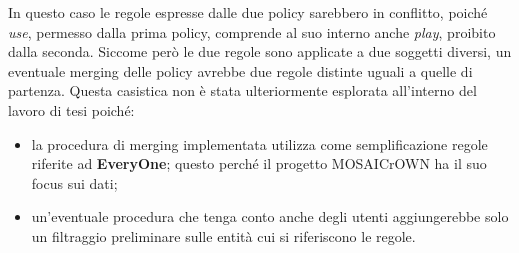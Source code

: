 \documentclass[12pt,a4paper,twoside]{book}
\begin{document}
In questo caso le regole espresse dalle due policy sarebbero in conflitto, poiché \textit{use}, permesso dalla prima policy, comprende al suo interno anche \textit{play}, proibito dalla seconda. Siccome però le due regole sono applicate a due soggetti diversi, un eventuale merging delle policy avrebbe due regole distinte uguali a quelle di partenza. Questa casistica non è stata ulteriormente esplorata all'interno del lavoro di tesi poiché:
\begin{itemize}
\item la procedura di merging implementata utilizza come semplificazione regole riferite ad \textbf{EveryOne}; questo perché il progetto MOSAICrOWN ha il suo focus sui dati;
\item un'eventuale procedura che tenga conto anche degli utenti aggiungerebbe solo un filtraggio preliminare sulle entità cui si riferiscono le regole.
\end{itemize}
\label{noStrat}
\end{document}

